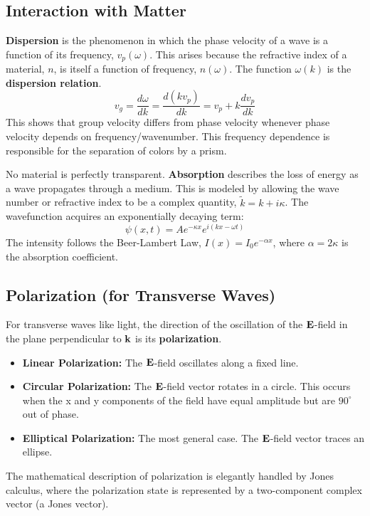 \begin{definition}
\subsection{Interaction with Matter}

\begin{definition}[Dispersion]
\textbf{Dispersion} is the phenomenon in which the phase velocity of a wave is a function of its frequency, $v_p(\omega)$. This arises because the refractive index of a material, $n$, is itself a function of frequency, $n(\omega)$. The function $\omega(k)$ is the \textbf{dispersion relation}.
$$ v_g = \frac{d\omega}{dk} = \frac{d(k v_p)}{dk} = v_p + k\frac{dv_p}{dk} $$
This shows that group velocity differs from phase velocity whenever phase velocity depends on frequency/wavenumber. This frequency dependence is responsible for the separation of colors by a prism.
\end{definition}

\begin{definition}[Absorption]
No material is perfectly transparent. \textbf{Absorption} describes the loss of energy as a wave propagates through a medium. This is modeled by allowing the wave number or refractive index to be a complex quantity, $\tilde{k} = k + i\kappa$. The wavefunction acquires an exponentially decaying term:
$$ \psi(x,t) = A e^{-\kappa x} e^{i(kx - \omega t)} $$
The intensity follows the Beer-Lambert Law, $I(x) = I_0 e^{-\alpha x}$, where $\alpha = 2\kappa$ is the absorption coefficient.
\end{definition}

\subsection{Polarization (for Transverse Waves)}

\begin{definition}
For transverse waves like light, the direction of the oscillation of the $\mathbf{E}$-field in the plane perpendicular to $\mathbf{k}$ is its \textbf{polarization}.
\begin{itemize}
    \item \textbf{Linear Polarization:} The $\mathbf{E}$-field oscillates along a fixed line.
    \item \textbf{Circular Polarization:} The $\mathbf{E}$-field vector rotates in a circle. This occurs when the x and y components of the field have equal amplitude but are $90^\circ$ out of phase.
    \item \textbf{Elliptical Polarization:} The most general case. The $\mathbf{E}$-field vector traces an ellipse.
\end{itemize}
The mathematical description of polarization is elegantly handled by Jones calculus, where the polarization state is represented by a two-component complex vector (a Jones vector).
\end{definition}


\end{definition}
